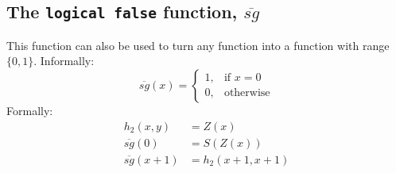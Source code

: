 \documentclass[11pt]{book}
\theoremstyle{definition}
\theoremstyle{plain}
\theoremstyle{problemstyle}
\theoremstyle{remark}
\theoremstyle{definition}
\begin{document}
\subsection*{The \texttt{logical false} function, $\overline{sg}$}
This function can also be used to turn any function into a function with range $\{0, 1\}$. Informally:
\[
    \overline{sg}(x)=\begin{cases}
			1, & \text{if $x=0$}\\
            0, & \text{otherwise}
	\end{cases}
\]
Formally:
            \begin{equation}
                \label{eq:logical-false}
                \begin{aligned}
                    h_2(x,y)&=Z(x)\\
                    \overline{sg}(0)&=S(Z(x))\\
                    \overline{sg}(x+1)&=h_2(x+1,x+1)
                \end{aligned}
            \end{equation}
\end{document}
